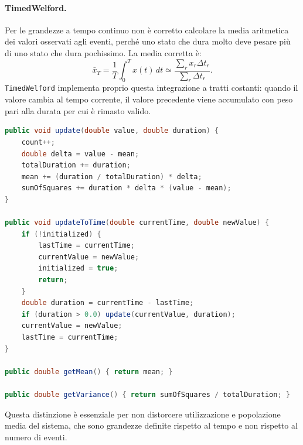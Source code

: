 ﻿\documentclass[a4paper,12pt]{article}
\begin{document}
\paragraph{TimedWelford.}
Per le grandezze a tempo continuo non è corretto calcolare la media aritmetica dei valori osservati agli eventi, perché uno stato che dura molto deve pesare più di uno stato che dura pochissimo. La media corretta è:
\begin{equation}
    \bar{x}_T = \frac{1}{T}\int_0^T x(t)\,dt
    \simeq
    \frac{\sum_r x_r \Delta t_r}{\sum_r \Delta t_r}.
\end{equation}
\texttt{TimedWelford} implementa proprio questa integrazione a tratti costanti: quando il valore cambia al tempo corrente, il valore precedente viene accumulato con peso pari alla durata per cui è rimasto valido.
\begin{lstlisting}[language=Java]
public void update(double value, double duration) {
    count++;
    double delta = value - mean;
    totalDuration += duration;
    mean += (duration / totalDuration) * delta;
    sumOfSquares += duration * delta * (value - mean);
}

public void updateToTime(double currentTime, double newValue) {
    if (!initialized) {
        lastTime = currentTime;
        currentValue = newValue;
        initialized = true;
        return;
    }
    double duration = currentTime - lastTime;
    if (duration > 0.0) update(currentValue, duration);
    currentValue = newValue;
    lastTime = currentTime;
}

public double getMean() { return mean; }

public double getVariance() { return sumOfSquares / totalDuration; }
\end{lstlisting}
Questa distinzione è essenziale per non distorcere utilizzazione e popolazione media del sistema, che sono grandezze definite rispetto al tempo e non rispetto al numero di eventi.
\end{document}
